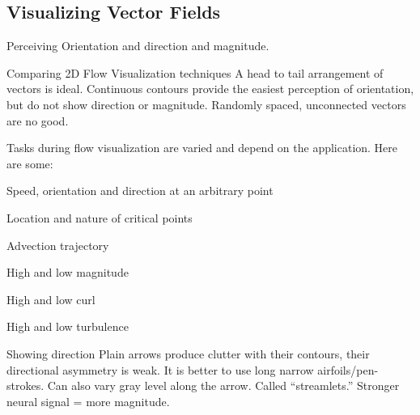 \begin{mdframed}\begin{multicols}{2}
\subsection{Visualizing Vector Fields}
\begin{compactdesc}
    \item[Perceiving Orientation and direction] and magnitude.
    \item[Comparing 2D Flow Visualization techniques]
        A head to tail arrangement of vectors is ideal. Continuous contours
        provide the easiest perception of orientation, but do not show
        direction or magnitude. Randomly spaced, unconnected vectors are no
        good.
    \item[Tasks during flow visualization] are varied and depend on the
        application. Here are some:
        \begin{compactenum}
        \item Speed, orientation and direction at an arbitrary point
        \item Location and nature of critical points
        \item Advection trajectory
        \item High and low magnitude
        \item High and low curl
        \item High and low turbulence
        \end{compactenum}

    \item[Showing direction]
        Plain arrows produce clutter with their contours, their directional
        asymmetry
        is weak.
        It is better to use long narrow airfoils/pen-strokes.
        Can also vary gray level along the arrow. Called ``streamlets.''
        Stronger neural signal = more magnitude.


\end{compactdesc}
\end{multicols}
\end{mdframed}
